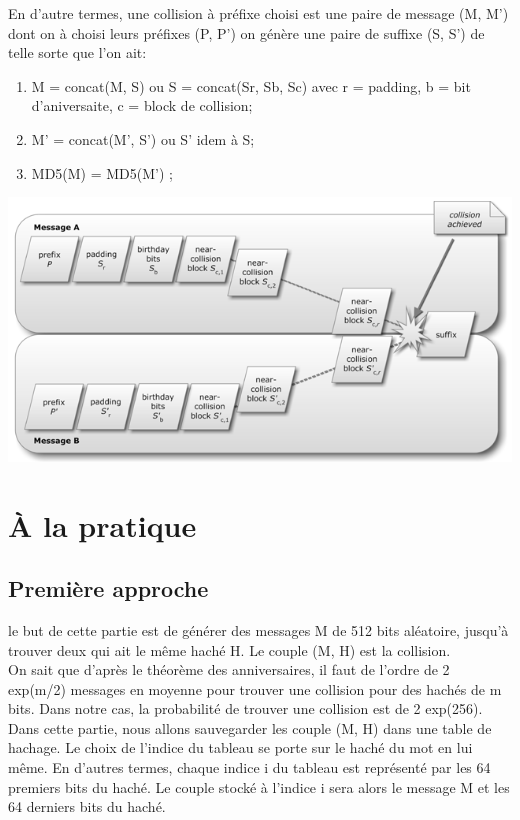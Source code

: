 \documentclass[a4paper,11pt,french]{article}
\begin{document}
En d'autre termes, une collision à préfixe choisi est une paire de  message (M, M') dont on à choisi leurs préfixes (P, P') on génère une paire de suffixe (S, S') de telle sorte que l'on ait:
\begin {enumerate}
 \item M = concat(M, S) ou S = concat(Sr, Sb, Sc) avec r = padding, b =  bit d'aniversaite, c = block de collision;
 \item M' = concat(M', S') ou S' idem à S;
 \item MD5(M) = MD5(M') ;
\end{enumerate}

\includegraphics[scale=.65]{collision.png}


\section{\`A la pratique}

\subsection{Première approche}
le but de cette partie est de générer des messages M de 512 bits aléatoire, jusqu'à trouver deux qui ait le même haché H. Le couple (M, H) est la collision.\\
On sait que d'après le théorème des anniversaires, il faut de l'ordre de 2 exp(m/2) messages en moyenne pour trouver une collision pour des hachés de m bits. Dans notre cas, la probabilité de trouver une collision est de 2 exp(256).\\

Dans cette partie, nous allons sauvegarder les couple (M, H) dans une table de hachage. Le choix de l'indice du tableau se porte sur le haché du mot en lui même. En d'autres termes, chaque indice i du tableau est représenté par les 64 premiers bits du haché. Le couple stocké à l'indice i sera alors le message M et les 64 derniers bits du haché.
\end{document}
